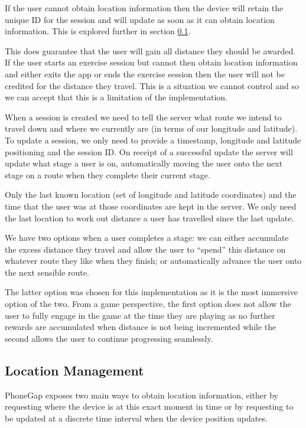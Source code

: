 If the user cannot obtain location information then the device will
retain the unique ID for the session and will update as soon as it can
obtain location information. This is explored further in section
\ref{sec:location_mgmt}.

This does guarantee that the user will gain all distance they should
be awarded. If the user starts an exercise session but cannot then
obtain location information and either exits the app or ends the
exercise session then the user will not be credited for the distance
they travel. This is a situation we cannot control and so we can
accept that this is a limitation of the implementation.

When a session is created we need to tell the server what route we
intend to travel down and where we currently are (in terms of our
longitude and latitude). To update a session, we only need to provide
a timestamp, longitude and latitude positioning and the session
ID. On receipt of a successful update the server will update what
stage a user is on, automatically moving the user onto the next stage
on a route when they complete their current stage. 

Only the last known location (set of longitude and latitude
coordinates) and the time that the user was at those coordinates are
kept in the server. We only need the last location 
to work out distance a user has travelled since the last update. 

We have two options when a user completes a stage: we can either
accumulate the excess distance they travel and allow the user to
``spend'' this distance on whatever route they like when they finish;
or automatically advance the user onto the next sensible route. 

The latter option was chosen for this implementation as it is the most
immersive option of the two. From a game perspective, the first option
does not allow the user to fully engage in the game at the time they
are playing as no further rewards are accumulated when distance is not
being incremented while the second allows the user to continue
progressing seamlessly. 

\subsection{Location Management}
\label{sec:location_mgmt}
PhoneGap exposes two main ways to obtain location information, either
by requesting where the device is at this exact moment in
time\cite{phonegap_currentpos} or by requesting to be updated at a
discrete time interval when the device position
updates\cite{phonegap_watchpos}. 

